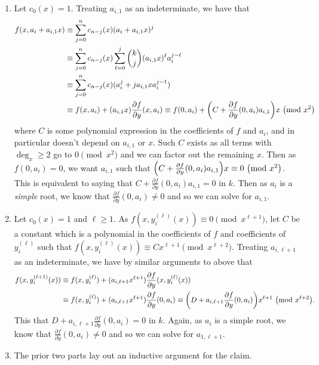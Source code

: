 \documentclass[letterpaper, 11pt, oneside]{book}
\begin{document}
\clearpage

\begin{sol}\label{ex:UAG_4.1.7}
  \begin{enumerate}
    \item Let $c_{0}(x) = 1$.
          Treating $a_{i, 1}$ as an indeterminate, we have that
          \begin{align*}
            f(x, a_{i} + a_{i, 1} x) &\equiv \sum_{j = 0}^{n} c_{n - j}(x)(a_{i} + a_{i, 1}x)^{j} \\
                                     &\equiv \sum_{j = 0}^{n} c_{n - j}(x) \sum_{\ell = 0}^{j} \binom{k}{j} (a_{i, 1}x)^{\ell} a_{i}^{j - \ell} \\
                                     &\equiv \sum_{j = 0}^{n} c_{n - j}(x)(a_{i}^{j} + j a_{i, 1} x a_{i}^{j - 1}) \\
                                     &\equiv f(x, a_{i}) + (a_{i, 1} x)\frac{\partial f}{\partial y}(x, a_{i}) \equiv f(0, a_{i}) + \pqty{C + \frac{\partial f}{\partial y}(0, a_{i}) a_{i, 1}}x \pmod{x^{2}}
          \end{align*}
          where $C$ is some polynomial expression in the coefficients of $f$ and $a_{i}$, and in particular doesn't depend on $a_{i, 1}$ or $x$.
          Such $C$ exists as all terms with $\deg_{x} \geq 2$ go to $0 \pmod{x^{2}}$ and we can factor out the remaining $x$.
          Then as $f(0, a_{i}) = 0$, we want $a_{i, 1}$ such that $\pqty{C + \frac{\partial f}{\partial y}(0, a_{i}) a_{i, 1}}x \equiv 0 \pmod{x^{2}}$.
          This is equivalent to saying that $C + \frac{\partial f}{\partial y}(0, a_{i}) a_{i, 1} = 0$ in $k$.
          Then as $a_{i}$ is a \emph{simple} root, we know that $\frac{\partial f}{\partial y}(0, a_{i}) \neq 0$ and so we can solve for $a_{i, 1}$.
    \item Let $c_{0}(x) = 1$ and $\ell \geq 1$.
          As $f(x, y_{i}^{(\ell)}(x)) \equiv 0 \pmod{x^{\ell + 1}}$, let $C$ be a constant which is a polynomial in the coefficients of $f$ and coefficients of $y_{i}^{(\ell)}$ such that $f(x, y_{i}^{(\ell)}(x)) \equiv C x^{\ell + 1} \pmod{x^{\ell + 2}}$.
          Treating $a_{i, \ell + 1}$ as an indeterminate, we have by similar arguments to above that
          \begin{align*}
            f(x, y_{i}^{(\ell + 1)}(x)) &\equiv f(x, y_{i}^{(\ell)}) + (a_{i, \ell + 1} x^{\ell + 1}) \frac{\partial f}{\partial y}(x, y_{i}^{(\ell)}(x)) \\
                                        &\equiv f(x, y_{i}^{(\ell)}) + (a_{i, \ell + 1} x^{\ell + 1}) \frac{\partial f}{\partial y}(0, a_{i}) \equiv \pqty{D + a_{i, \ell + 1} \frac{\partial f}{\partial y}(0, a_{i})}x^{\ell + 1} \pmod{x^{\ell + 2}}.
          \end{align*}
          This  that $D + a_{i, \ell + 1} \frac{\partial f}{\partial y}(0, a_{i}) = 0$ in $k$.
          Again, as $a_{i}$ is a simple root, we know that $\frac{\partial f}{\partial y}(0, a_{i}) \neq 0$ and so we can solve for $a_{1, \ell + 1}$.
    \item The prior two parts lay out an inductive argument for the claim.
  \end{enumerate}
\end{sol}
\end{document}
